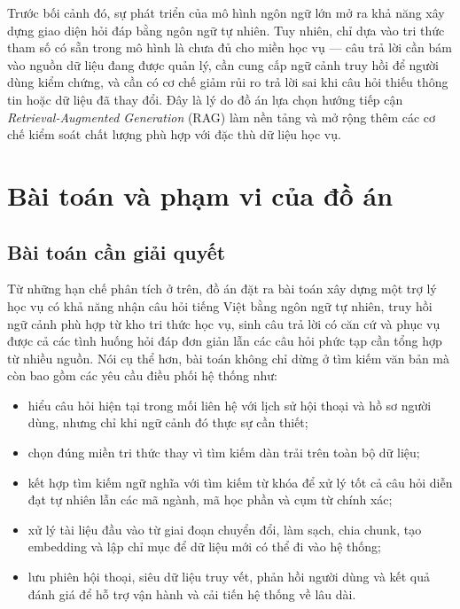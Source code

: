 \documentclass[../DoAn.tex]{subfiles}
\begin{document}
Trước bối cảnh đó, sự phát triển của mô hình ngôn ngữ lớn mở ra khả năng xây
dựng giao diện hỏi đáp bằng ngôn ngữ tự nhiên. Tuy nhiên, chỉ dựa vào tri thức
tham số có sẵn trong mô hình là chưa đủ cho miền học vụ — câu trả lời cần bám
vào nguồn dữ liệu đang được quản lý, cần cung cấp ngữ cảnh truy hồi để người
dùng kiểm chứng, và cần có cơ chế giảm rủi ro trả lời sai khi câu hỏi thiếu
thông tin hoặc dữ liệu đã thay đổi. Đây là lý do đồ án lựa chọn hướng tiếp cận
\textit{Retrieval-Augmented Generation} (RAG) làm nền tảng và mở rộng thêm
các cơ chế kiểm soát chất lượng phù hợp với đặc thù dữ liệu học vụ.

\section{Bài toán và phạm vi của đồ án}
\label{sec:phamvi}

\subsection{Bài toán cần giải quyết}

Từ những hạn chế phân tích ở trên, đồ án đặt ra bài toán xây dựng một trợ lý
học vụ có khả năng nhận câu hỏi tiếng Việt bằng ngôn ngữ tự nhiên, truy hồi
ngữ cảnh phù hợp từ kho tri thức học vụ, sinh câu trả lời có căn cứ và phục vụ
được cả các tình huống hỏi đáp đơn giản lẫn các câu hỏi phức tạp cần tổng hợp
từ nhiều nguồn. Nói cụ thể hơn, bài toán không chỉ dừng ở tìm kiếm văn bản mà
còn bao gồm các yêu cầu điều phối hệ thống như:

\begin{itemize}
    \item hiểu câu hỏi hiện tại trong mối liên hệ với lịch sử hội thoại và hồ
    sơ người dùng, nhưng chỉ khi ngữ cảnh đó thực sự cần thiết;
    \item chọn đúng miền tri thức thay vì tìm kiếm dàn trải trên toàn bộ dữ
    liệu;
    \item kết hợp tìm kiếm ngữ nghĩa với tìm kiếm từ khóa để xử lý tốt cả câu
    hỏi diễn đạt tự nhiên lẫn các mã ngành, mã học phần và cụm từ chính xác;
    \item xử lý tài liệu đầu vào từ giai đoạn chuyển đổi, làm sạch, chia
    chunk, tạo embedding và lập chỉ mục để dữ liệu mới có thể đi vào hệ thống;
    \item lưu phiên hội thoại, siêu dữ liệu truy vết, phản hồi người dùng và
    kết quả đánh giá để hỗ trợ vận hành và cải tiến hệ thống về lâu dài.
\end{itemize}
\end{document}
